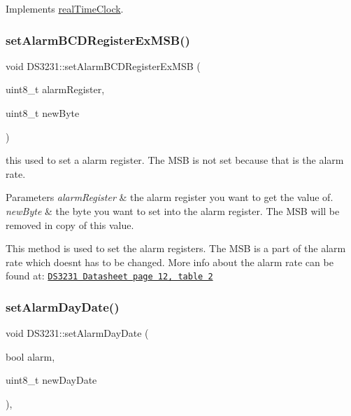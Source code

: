 Implements \mbox{\hyperlink{classreal_time_clock_aacf97da86677ee3fb55b5180ba5c0727}{real\+Time\+Clock}}.

\mbox{\label{class_d_s3231_a79280f7161eaa45b50fe649eda9c480a}} 
\subsubsection{\texorpdfstring{set\+Alarm\+B\+C\+D\+Register\+Ex\+M\+S\+B()}{setAlarmBCDRegisterExMSB()}}
{\footnotesize\ttfamily void D\+S3231\+::set\+Alarm\+B\+C\+D\+Register\+Ex\+M\+SB (\begin{DoxyParamCaption}\item[{uint8\+\_\+t}]{alarm\+Register,  }\item[{uint8\+\_\+t}]{new\+Byte }\end{DoxyParamCaption})\hspace{0.3cm}{\ttfamily [private]}}



this used to set a alarm register. The M\+SB is not set because that is the alarm rate. 


\begin{DoxyParams}{Parameters}
{\em alarm\+Register} & the alarm register you want to get the value of. \\
\hline
{\em new\+Byte} & the byte you want to set into the alarm register. The M\+SB will be removed in copy of this value.\\
\hline
\end{DoxyParams}
This method is used to set the alarm registers. The M\+SB is a part of the alarm rate which doesn\textquotesingle{}t has to be changed. More info about the alarm rate can be found at\+: \href{https://datasheets.maximintegrated.com/en/ds/DS3231.pdf}{\tt D\+S3231 Datasheet page 12, table 2} \mbox{\label{class_d_s3231_aa2048cc766ca58f707e84cbc564c1276}} 
\subsubsection{\texorpdfstring{set\+Alarm\+Day\+Date()}{setAlarmDayDate()}}
{\footnotesize\ttfamily void D\+S3231\+::set\+Alarm\+Day\+Date (\begin{DoxyParamCaption}\item[{bool}]{alarm,  }\item[{uint8\+\_\+t}]{new\+Day\+Date }\end{DoxyParamCaption})\hspace{0.3cm}{\ttfamily [override]}, {\ttfamily [virtual]}}



